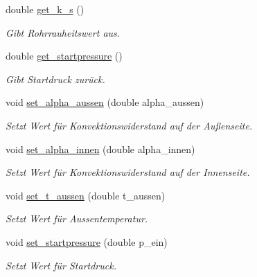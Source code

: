 \begin{DoxyCompactItemize}
\mbox{\label{class_rohr_a653e53a000dd4ed025d1adbdb83f7859}} 
double \hyperlink{class_rohr_a653e53a000dd4ed025d1adbdb83f7859}{get\+\_\+k\+\_\+s} ()
\begin{DoxyCompactList}\small\item\em Gibt Rohrrauheitswert aus. \end{DoxyCompactList}\item 
\mbox{\label{class_rohr_ad93033ce4a63458e188cfc9d8771836e}} 
double \hyperlink{class_rohr_ad93033ce4a63458e188cfc9d8771836e}{get\+\_\+startpressure} ()
\begin{DoxyCompactList}\small\item\em Gibt Startdruck zurück. \end{DoxyCompactList}\item 
\mbox{\label{class_rohr_ae6e604082fdb43a35bcdc74478ced8a7}} 
void \hyperlink{class_rohr_ae6e604082fdb43a35bcdc74478ced8a7}{set\+\_\+alpha\+\_\+aussen} (double alpha\+\_\+aussen)
\begin{DoxyCompactList}\small\item\em Setzt Wert für Konvektionswiderstand auf der Außenseite. \end{DoxyCompactList}\item 
\mbox{\label{class_rohr_aed25a50fcf5c735e51693303d8b41663}} 
void \hyperlink{class_rohr_aed25a50fcf5c735e51693303d8b41663}{set\+\_\+alpha\+\_\+innen} (double alpha\+\_\+innen)
\begin{DoxyCompactList}\small\item\em Setzt Wert für Konvektionswiderstand auf der Innenseite. \end{DoxyCompactList}\item 
\mbox{\label{class_rohr_a92be37f04575328b6b15de5ab2e511a9}} 
void \hyperlink{class_rohr_a92be37f04575328b6b15de5ab2e511a9}{set\+\_\+t\+\_\+aussen} (double t\+\_\+aussen)
\begin{DoxyCompactList}\small\item\em Setzt Wert für Aussentemperatur. \end{DoxyCompactList}\item 
\mbox{\label{class_rohr_ac9d6974bc17fde3cba4b67fb571c7ab7}} 
void \hyperlink{class_rohr_ac9d6974bc17fde3cba4b67fb571c7ab7}{set\+\_\+startpressure} (double p\+\_\+ein)
\begin{DoxyCompactList}\small\item\em Setzt Wert für Startdruck. \end{DoxyCompactList}\end{DoxyCompactItemize}


